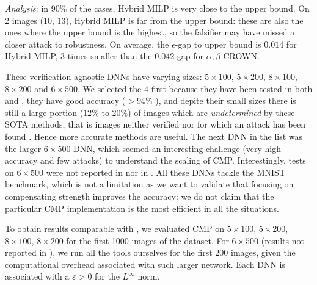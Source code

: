 {\em Analysis}: in 90\% of the cases, Hybrid MILP is very close to the upper bound. On 2 images (10, 13), Hybrid MILP is far from the upper bound: these are also the ones where the upper bound is the highest, so the falsifier may have missed a closer attack to robustness. On average, the $\epsilon$-gap to upper bound is $0.014$ for Hybrid MILP, 3 times smaller than the $0.042$ gap for $\alpha,\beta$-CROWN.

\fi

\iffalse

These verification-agnostic DNNs have varying sizes: $5\times 100$, $5\times 200$, $8 \times 100$, $8 \times 200$ and $6 \times 500$. We selected the 4 first because they have been tested in both \cite{prima} and \cite{CROWN}, they have good accuracy ($>94\%$ \cite{prima}), 
and depite their small sizes there is still a large portion ($12\%$ to $20\%$) of images which are {\em undetermined} by these SOTA methods, that is images neither verified nor for which an attack has been found  \cite{attack}. Hence more accurate methods are useful. 
The next DNN in the list was the larger $6 \times 500$ DNN, which seemed an interesting challenge (very high accuracy and few attacks) to understand the scaling of CMP. Interestingly, tests on $6 \times 500$ were not reported in \cite{prima} nor in \cite{CROWN}. All these DNNs tackle the MNIST benchmark, which is not a limitation as we want to validate that focusing on compensating strength improves the accuracy: we do not claim that the particular CMP implementation is the most efficient in all the situations.

To obtain results comparable with \cite{prima,CROWN}, 
we evaluated CMP on $5\times 100$, $5\times 200$, $8 \times 100$, $8 \times 200$ for the first 1000 images of the dataset. For $6\times 500$ (results not reported in \cite{prima,CROWN}), we run all the tools ourselves for the first 200 images, given the computational overhead associated with such larger network. Each DNN is associated with a $\varepsilon>0$ for the $L^\infty$ norm.

\smallskip

